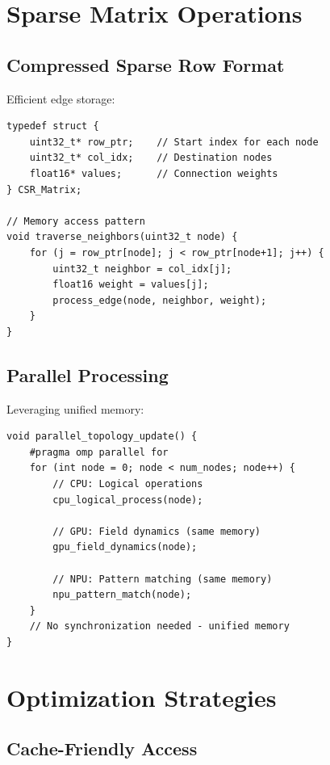 \documentclass[12pt,a4paper,openany]{book} %
\begin{document}
\section{Sparse Matrix Operations}

\subsection{Compressed Sparse Row Format}

Efficient edge storage:

\begin{lstlisting}[style=cpp]
typedef struct {
    uint32_t* row_ptr;    // Start index for each node
    uint32_t* col_idx;    // Destination nodes
    float16* values;      // Connection weights
} CSR_Matrix;

// Memory access pattern
void traverse_neighbors(uint32_t node) {
    for (j = row_ptr[node]; j < row_ptr[node+1]; j++) {
        uint32_t neighbor = col_idx[j];
        float16 weight = values[j];
        process_edge(node, neighbor, weight);
    }
}
\end{lstlisting}
\vspace{0.5em}

\subsection{Parallel Processing}

Leveraging unified memory:

\begin{lstlisting}[style=cpp]
void parallel_topology_update() {
    #pragma omp parallel for
    for (int node = 0; node < num_nodes; node++) {
        // CPU: Logical operations
        cpu_logical_process(node);

        // GPU: Field dynamics (same memory)
        gpu_field_dynamics(node);

        // NPU: Pattern matching (same memory)
        npu_pattern_match(node);
    }
    // No synchronization needed - unified memory
}
\end{lstlisting}
\vspace{0.5em}

\section{Optimization Strategies}

\subsection{Cache-Friendly Access}
\end{document}
